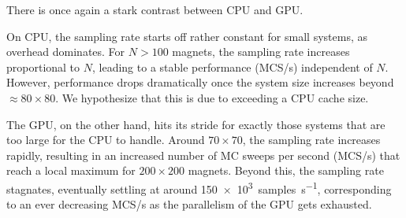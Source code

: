 There is once again a stark contrast between CPU and GPU. \par
On CPU, the sampling rate starts off rather constant for small systems, as overhead dominates.
For $N>100$ magnets, the sampling rate increases proportional to $N$, leading to a stable performance (MCS/s) independent of $N$.
However, performance drops dramatically once the system size increases beyond $\approx 80 \times 80$. %
We hypothesize that this is due to exceeding a CPU cache size. \par
The GPU, on the other hand, hits its stride for exactly those systems that are too large for the CPU to handle.
Around $70 \times 70$, the sampling rate increases rapidly, resulting in an increased number of MC sweeps per second (MCS/s) that reach a local maximum for $200 \times 200$ magnets.
Beyond this, the sampling rate stagnates, eventually settling at around \SI{150e3}{samples\per\second}, corresponding to an ever decreasing MCS/s as the parallelism of the GPU gets exhausted.

